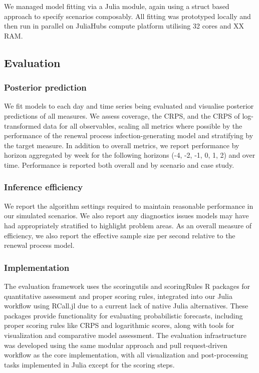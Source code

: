 \documentclass{getwriting}
\begin{document}
We managed model fitting via a Julia module, again using a struct based approach to specify scenarios composably. All fitting was prototyped locally and then run in parallel on JuliaHubs compute platform utilising 32 cores and XX RAM.

\subsection{Evaluation}

\subsubsection{Posterior prediction}

We fit models to each day and time series being evaluated and visualise posterior predictions of all measures. We assess coverage, the CRPS, and the CRPS of log-transformed data for all observables, scaling all metrics where possible by the performance of the renewal process infection-generating model and stratifying by the target measure. In addition to overall metrics, we report performance by horizon aggregated by week for the following horizons (-4, -2, -1, 0, 1, 2) and over time. Performance is reported both overall and by scenario and case study.

\subsubsection{Inference efficiency}

We report the algorithm settings required to maintain reasonable performance in our simulated scenarios. We also report any diagnostics issues models may have had appropriately stratified to highlight problem areas. As an overall measure of efficiency, we also report the effective sample size per second relative to the renewal process model.

\subsubsection{Implementation}

The evaluation framework uses the scoringutils and scoringRules R packages for quantitative assessment and proper scoring rules, integrated into our Julia workflow using RCall.jl due to a current lack of native Julia alternatives. These packages provide functionality for evaluating probabilistic forecasts, including proper scoring rules like CRPS and logarithmic scores, along with tools for visualization and comparative model assessment. The evaluation infrastructure was developed using the same modular approach and pull request-driven workflow as the core implementation, with all visualization and post-processing tasks implemented in Julia except for the scoring steps.
\end{document}

